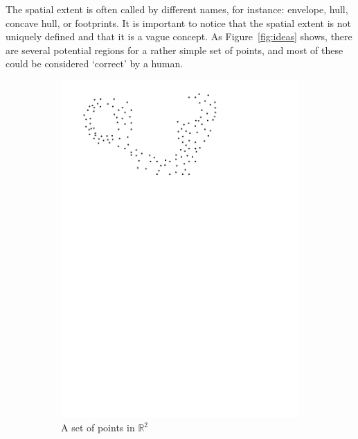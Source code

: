The spatial extent is often called by different names, for instance: envelope, hull, concave hull, or footprints.
It is important to notice that the spatial extent is not uniquely defined and that it is a vague concept.
As Figure~\ref{fig:ideas} shows, there are several potential regions for a rather simple set of points, and most of these could be considered `correct' by a human.
\begin{figure}
  \centering
  \begin{subfigure}[b]{0.21\linewidth}
    \centering
    \includegraphics[page=1,width=\textwidth]{figs/idea.pdf}
    \caption{A set of points in $\mathbb{R}^2$}
  \end{subfigure}%
  \qquad
  \begin{subfigure}[b]{0.21\linewidth}
    \centering

\end{subfigure}
\end{figure}
